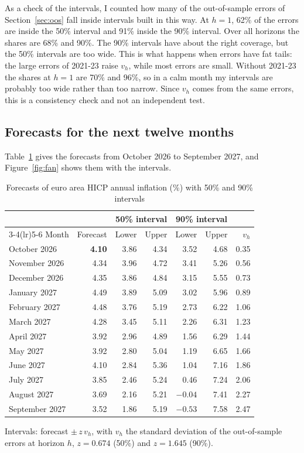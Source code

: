 \documentclass[11pt]{article}
\begin{document}
As a check of the intervals, I counted how many of the out-of-sample errors of Section~\ref{sec:oos} fall inside intervals built in this way. At $h=1$, 62\% of the errors are inside the 50\% interval and 91\% inside the 90\% interval. Over all horizons the shares are 68\% and 90\%. The 90\% intervals have about the right coverage, but the 50\% intervals are too wide. This is what happens when errors have fat tails: the large errors of 2021-23 raise $v_h$, while most errors are small. Without 2021-23 the shares at $h=1$ are 70\% and 96\%, so in a calm month my intervals are probably too wide rather than too narrow. Since $v_h$ comes from the same errors, this is a consistency check and not an independent test.

\subsection{Forecasts for the next twelve months}

Table~\ref{tab:fc} gives the forecasts from October 2026 to September 2027, and Figure~\ref{fig:fan} shows them with the intervals.

\begin{table}[htbp]
\centering
\small
\caption{Forecasts of euro area HICP annual inflation (\%) with 50\% and 90\% intervals}
\label{tab:fc}
\begin{tabular}{@{}lrrrrrr@{}}
\toprule
 & & \multicolumn{2}{c}{50\% interval} & \multicolumn{2}{c}{90\% interval} & \\
\cmidrule(lr){3-4}\cmidrule(lr){5-6}
Month & Forecast & Lower & Upper & Lower & Upper & $v_h$\\
\midrule
\rowcolor{gray!30} October 2026 & \textbf{4.10} & 3.86 & 4.34 & 3.52 & 4.68 & 0.35\\
November 2026 & 4.34 & 3.96 & 4.72 & 3.41 & 5.26 & 0.56\\
December 2026 & 4.35 & 3.86 & 4.84 & 3.15 & 5.55 & 0.73\\
January 2027 & 4.49 & 3.89 & 5.09 & 3.02 & 5.96 & 0.89\\
February 2027 & 4.48 & 3.76 & 5.19 & 2.73 & 6.22 & 1.06\\
March 2027 & 4.28 & 3.45 & 5.11 & 2.26 & 6.31 & 1.23\\
April 2027 & 3.92 & 2.96 & 4.89 & 1.56 & 6.29 & 1.44\\
May 2027 & 3.92 & 2.80 & 5.04 & 1.19 & 6.65 & 1.66\\
June 2027 & 4.10 & 2.84 & 5.36 & 1.04 & 7.16 & 1.86\\
July 2027 & 3.85 & 2.46 & 5.24 & 0.46 & 7.24 & 2.06\\
August 2027 & 3.69 & 2.16 & 5.21 & $-0.04$ & 7.41 & 2.27\\
September 2027 & 3.52 & 1.86 & 5.19 & $-0.53$ & 7.58 & 2.47\\
\bottomrule
\end{tabular}

\vspace{3pt}
{\footnotesize Intervals: forecast $\pm\,z\,v_h$, with $v_h$ the standard deviation of the out-of-sample errors at horizon $h$, $z=0.674$ (50\%) and $z=1.645$ (90\%).}
\end{table}
\end{document}
